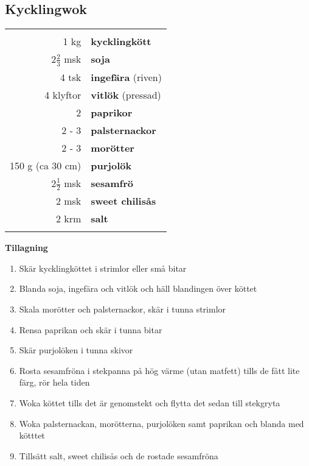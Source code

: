 \clearpage

\subsection{Kycklingwok}

\begin{table}[H]
	\begin{tabular}{rl}
	\hline
	&\\
		1 kg & \textbf{kycklingkött}\\
		2$\frac{2}{3}$ msk & \textbf{soja}\\
		4 tsk & \textbf{ingefära} (riven)\\
		4 klyftor & \textbf{vitlök} (pressad)\\
		2 & \textbf{paprikor}\\
		2 - 3 & \textbf{palsternackor}\\
		2 - 3 & \textbf{morötter}\\
		150 g (ca 30 cm) & \textbf{purjolök}\\
		2$\frac{1}{2}$ msk & \textbf{sesamfrö}\\
		2 msk & \textbf{sweet chilisås}\\
		2 krm & \textbf{salt}\\
	&\\
	\hline
	\end{tabular}
\end{table}


\begin{multicols*}{2}

\noindent \textbf{Tillagning}
\begin{enumerate}
	\itemsep0cm
	\item Skär kycklingköttet i strimlor eller små bitar
	\item Blanda soja, ingefära och vitlök och häll blandingen över köttet
	\item Skala morötter och palster\-nackor, skär i tunna strimlor
	\item Rensa paprikan och skär i \mbox{tunna} bitar
	\item Skär purjolöken i tunna skivor
	\item Rosta sesamfröna i stekpanna på hög värme (utan matfett) tills de fått lite färg, rör hela \mbox{tiden}
	\item Woka köttet tills det är genomstekt och flytta det sedan till stekgryta
	\item Woka palsternackan, \mbox{morötterna}, purjolöken samt paprikan och blanda med kötttet
	\item Tillsätt salt, sweet chilisås och de rostade sesamfröna
\end{enumerate}

\end{multicols*}

